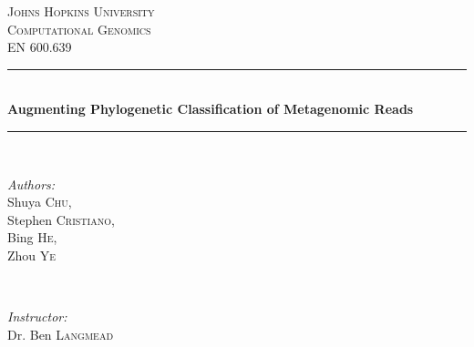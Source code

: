 \documentclass[12pt]{article} %
\begin{document}
\begin{titlepage}

\newcommand{\HRule}{\rule{\linewidth}{0.5mm}} %

\center %
 

\textsc{\LARGE Johns Hopkins University}\\[1.5cm] %
\textsc{\Large Computational Genomics}\\[0.5cm] %
\textsc{\large EN 600.639}\\[0.5cm] %


\HRule \\[0.4cm]
{ \huge \bfseries Augmenting Phylogenetic Classification of Metagenomic Reads}\\[0.4cm] %
\HRule \\[1.5cm]
 

\begin{minipage}{0.4\textwidth}
\begin{flushleft} \large
\emph{Authors:}\\
Shuya \textsc{Chu}, \\  Stephen \textsc{Cristiano}, \\ Bing \textsc{He},\\  Zhou \textsc{Ye} %
\end{flushleft}
\end{minipage}
~
\begin{minipage}{0.4\textwidth}
\begin{flushright} \large
\emph{Instructor:} \\
Dr. Ben \textsc{Langmead} %
\end{flushright}
\end{minipage}\\[4cm]


\end{titlepage}
\end{document}
